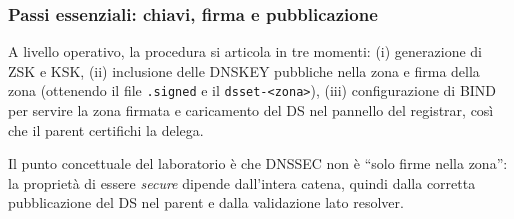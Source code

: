 \subsubsection{Passi essenziali: chiavi, firma e pubblicazione}
A livello operativo, la procedura si articola in tre momenti: (i) generazione di ZSK e KSK, (ii) inclusione delle DNSKEY pubbliche nella zona e firma della zona (ottenendo il file \texttt{.signed} e il \texttt{dsset-<zona>}), (iii) configurazione di BIND per servire la zona firmata e caricamento del DS nel pannello del registrar, così che il parent certifichi la delega.

Il punto concettuale del laboratorio è che DNSSEC non è “solo firme nella zona”: la proprietà di essere \emph{secure} dipende dall’intera catena, quindi dalla corretta pubblicazione del DS nel parent e dalla validazione lato resolver.
